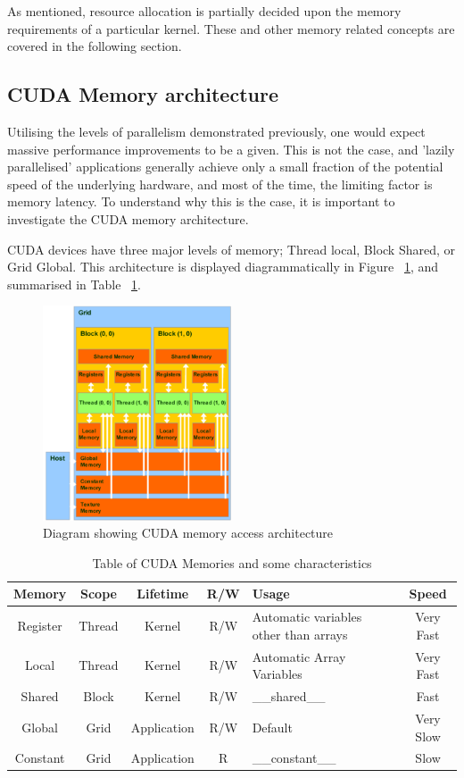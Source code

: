 As mentioned, resource allocation is partially decided upon the memory requirements of a particular kernel. These and other memory related concepts are covered in the following section.

\subsection{CUDA Memory architecture}
Utilising the levels of parallelism demonstrated previously, one would expect massive performance improvements to be a given. This is not the case, and 'lazily parallelised' applications generally achieve only a small fraction of the potential speed of the underlying hardware, and most of the time, the limiting factor is memory latency. To understand why this is the case, it is important to investigate the CUDA memory architecture.

CUDA devices have three major levels of memory; Thread local, Block Shared, or Grid Global. This architecture is displayed diagrammatically in Figure ~\ref{fig:CUDAMemArch}, and summarised in Table ~\ref{tab:CUDAMemTable}.

\begin{figure}[h!]
  \centering
  \includegraphics[width=0.5\textwidth,keepaspectratio=true]{images/cuda_mem_arch.png}
  \caption{Diagram showing CUDA memory access architecture}
  \label{fig:CUDAMemArch}
\end{figure}

\begin{table}[!ht]
\begin{tabularx}{\textwidth}{|c|c|c|c|X|c|}\hline
Memory&Scope&Lifetime&R/W&Usage&Speed\\\hline
Register&Thread&Kernel&R/W&Automatic variables other than arrays&Very Fast\\
Local&Thread&Kernel&R/W&Automatic Array Variables&Very Fast\\\hline
Shared&Block&Kernel&R/W&\_\_shared\_\_&Fast\\\hline
Global&Grid&Application&R/W&Default&Very Slow\\
Constant&Grid&Application&R&\_\_constant\_\_&Slow\\\hline
\end{tabularx}
\caption{Table of CUDA Memories and some characteristics}
\label{tab:CUDAMemTable}
\end{table}

